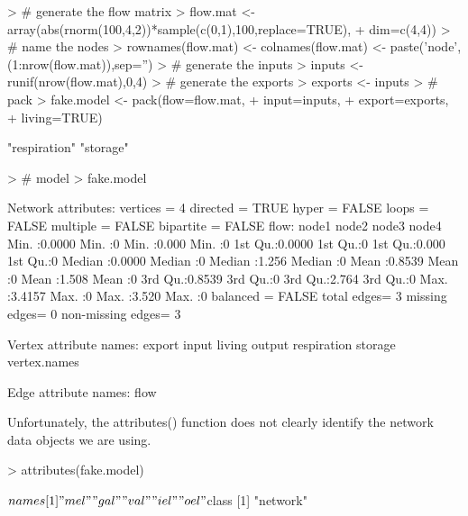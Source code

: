 \documentclass[11pt]{article}
\begin{document}
\begin{Schunk}
\begin{Sinput}
> # generate the flow matrix
> flow.mat <- array(abs(rnorm(100,4,2))*sample(c(0,1),100,replace=TRUE),
+                    dim=c(4,4))
> # name the nodes
> rownames(flow.mat) <- colnames(flow.mat) <- paste('node',(1:nrow(flow.mat)),sep='')
> # generate the inputs
> inputs <- runif(nrow(flow.mat),0,4)
> # generate the exports
> exports <- inputs
> # pack
> fake.model <- pack(flow=flow.mat,
+                     input=inputs,
+                     export=exports,
+                     living=TRUE)
\end{Sinput}
\begin{Soutput}
[1] "respiration" "storage"    
\end{Soutput}
\begin{Sinput}
> # model
> fake.model
\end{Sinput}
\begin{Soutput}
 Network attributes:
  vertices = 4 
  directed = TRUE 
  hyper = FALSE 
  loops = FALSE 
  multiple = FALSE 
  bipartite = FALSE 
  flow:
     node1            node2       node3           node4  
 Min.   :0.0000   Min.   :0   Min.   :0.000   Min.   :0  
 1st Qu.:0.0000   1st Qu.:0   1st Qu.:0.000   1st Qu.:0  
 Median :0.0000   Median :0   Median :1.256   Median :0  
 Mean   :0.8539   Mean   :0   Mean   :1.508   Mean   :0  
 3rd Qu.:0.8539   3rd Qu.:0   3rd Qu.:2.764   3rd Qu.:0  
 Max.   :3.4157   Max.   :0   Max.   :3.520   Max.   :0  
  balanced = FALSE 
  total edges= 3 
    missing edges= 0 
    non-missing edges= 3 

 Vertex attribute names: 
    export input living output respiration storage vertex.names 

 Edge attribute names: 
    flow 
\end{Soutput}
\end{Schunk}

Unfortunately, the attributes() function does not clearly identify the
network data objects we are using.

\begin{Schunk}
\begin{Sinput}
> attributes(fake.model)
\end{Sinput}
\begin{Soutput}
$names
[1] "mel" "gal" "val" "iel" "oel"

$class
[1] "network"
\end{Soutput}
\end{Schunk}
\end{document}
